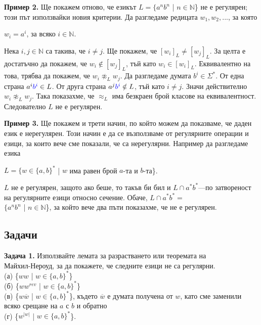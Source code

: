 \documentclass[openany]{book}
\begin{document}
    \vspace{15pt}

    \textbf{Пример 2.} Ще покажем отново, че езикът $L = \{a^nb^n$ | $n \in \mathbb{N}$\}
    не е регулярен; този път използвайки новия критерии.
    Да разгледаме редицата $w_1,w_2,...$, за която 
    \begin{center}
        $w_i = a^i$, за всяко $i \in \mathbb{N}$.
    \end{center}
    Нека $i,j \in \mathbb{N}$ са такива, че $i \neq j$. Ще покажем, че $[w_i]_L \neq [w_j]_L$.
    За целта е достатъчно да покажем, че $w_i \notin [w_j]_L$, тъй като $w_i \in [w_i]_L$.
    Еквивалентно на това, трябва да покажем, че $w_i \not \approx_L w_j$. Да разгледаме
    думата $b^i \in \Sigma^*$. От една страна $a^i\textcolor{blue}{b^i} \in L$. От друга страна $a^j\textcolor{blue}{b^i} \notin L$,
    тъй като $i \neq j$. Значи действително $w_i \not \approx_L w_j$. Така показахме,
    че $\approx_L$ има безкраен брой класове на еквивалентност. Следователно $L$ не е
    регулярен.
    
    \vspace{15pt}

    \textbf{Пример 3.} Ще покажем и трети начин, по който можем да показваме, че даден
    език е нерегулярен. Този начин е да се възползваме от регулярните операции и езици,
    за които вече сме показали, че са нерегулярни. Например да разгледаме езика
    \begin{center}
        $L = \{w \in \{a,b\}^*$ | $w$ има равен брой $a$-та и $b$-та\}.
    \end{center}
    $L$ не е регулярен, защото ако беше, то такъв би бил и $L \cap a^*b^*$—по затвореност
    на регулярните езици относно сечение. Обаче, $L \cap a^*b^* =$ \\
    $\{a^nb^n$ | $n \in \mathbb{N}$\},
    за който вече два пъти показахме, че не е регулярен.
\vspace{25pt}

\subsection{Задачи}
    \textbf{Задача 1.} Използвайте лемата за разрастването или теоремата на \\Майхил-Нероуд,
    за да покажете, че следните езици не са регулярни. \\
    (а) \{$ww$ | $w \in \{a,b\}^*$\} \\
    (б) \{$ww^{rev}$ | $w \in \{a,b\}^*$\} \\
    (в) \{$w\overline{w}$ | $w \in \{a,b\}^*$\}, където $\overline{w}$ е думата получена от $w$, 
    като сме заменили всяко срещане на $a$ с $b$ и обратно \\
    (г) \{$w^{|w|}$ | $w \in \{a,b\}^*$\}.
\end{document}

